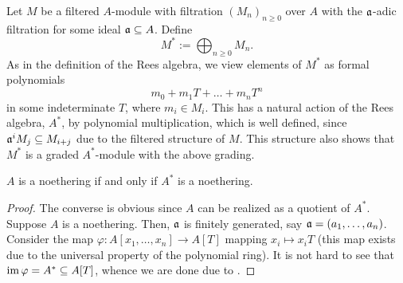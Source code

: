 \begin{definition}
    Let $M$ be a filtered $A$-module with filtration $(M_n)_{n\ge 0}$ over $A$ with the $\mathfrak a$-adic filtration for some ideal $\mathfrak a\subseteq A$. Define 
    \begin{equation*}
        M^\ast := \bigoplus_{n\ge 0} M_n.
    \end{equation*}
    As in the definition of the Rees algebra, we view elements of $M^\ast$ as formal polynomials 
    \begin{equation*}
        m_0 + m_1T + \dots + m_nT^n
    \end{equation*}
    in some indeterminate $T$, where $m_i\in M_i$. This has a natural action of the Rees algebra, $A^\ast$, by polynomial multiplication, which is well defined, since $\mathfrak a^iM_j\subseteq M_{i + j}$ due to the filtered structure of $M$. This structure also shows that $M^\ast$ is a graded $A^\ast$-module with the above grading.
\end{definition}

\begin{proposition}
    $A$ is a noethering if and only if $A^\ast$ is a noethering.
\end{proposition}
\begin{proof}
    The converse is obvious since $A$ can be realized as a quotient of $A^\ast$. Suppose $A$ is a noethering. Then, $\mathfrak a$ is finitely generated, say $\mathfrak a = (a_1,\dots,a_n)$. Consider the map $\varphi: A[x_1,\dots,x_n]\to A[T]$ mapping $x_i\mapsto x_iT$ (this map exists due to the universal property of the polynomial ring). It is not hard to see that $\operatorname{im}\varphi = A^\ast\subseteq A[T]$, whence we are done due to .
\end{proof}

